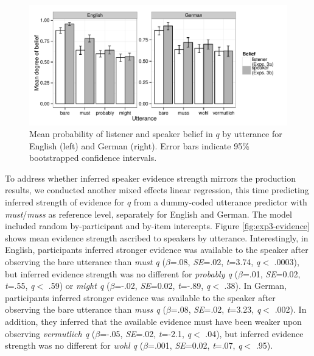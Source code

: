 \documentclass[11pt]{article}
\newcommand{\figref}[1]{Figure \ref{#1}}
\begin{document}
\begin{figure}
	\centering
	\includegraphics[width=\textwidth]{pics/mean-beliefs}
	\caption{Mean probability of listener and speaker belief in $q$ by utterance for English (left) and German (right). Error bars indicate 95\% bootstrapped confidence intervals.}
	\label{fig:expt3}
\end{figure}

To address whether inferred speaker evidence strength mirrors the production results, we conducted another mixed effects linear regression, this time predicting inferred strength of evidence for $q$ from a dummy-coded utterance predictor with \emph{must}/\emph{muss} as reference level, separately for English and German. The model included random by-participant and by-item intercepts.  \figref{fig:exp3-evidence} shows mean evidence strength ascribed to speakers by utterance. Interestingly, in English, participants inferred stronger evidence was available to the speaker after observing the bare utterance than \emph{must q} ($\beta$=.08, \emph{SE}=.02, \emph{t}=3.74, \emph{q}$<$ .0003), but inferred evidence strength was no different for \emph{probably q} ($\beta$=.01, \emph{SE}=0.02, \emph{t}=.55, \emph{q}$<$ .59) or \emph{might q} ($\beta$=-.02, \emph{SE}=0.02, \emph{t}=-.89, \emph{q}$<$ .38). In German, participants inferred stronger evidence was available to the speaker after observing the bare utterance than \emph{muss q} ($\beta$=.08, \emph{SE}=.02, \emph{t}=3.23, \emph{q}$<$ .002). In addition, they inferred that the available evidence must have been weaker upon observing \emph{vermutlich q} ($\beta$=-.05, \emph{SE}=.02, \emph{t}=-2.1, \emph{q}$<$ .04), but inferred evidence strength was no different for \emph{wohl q} ($\beta$=.001, \emph{SE}=0.02, \emph{t}=.07, \emph{q}$<$ .95). %
\end{document}
